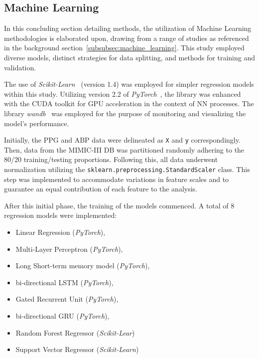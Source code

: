 \subsection{Machine Learning}
\label{subsec:ml_methods}

In this concluding section detailing methods, the utilization of Machine Learning methodologies is elaborated upon,
drawing from a range of studies as referenced in the background section~\ref{subsubsec:machine_learning}.
This study employed diverse models, distinct strategies for data splitting, and methods for training and validation.

The use of \textit{Scikit-Learn}~\cite{ScikitlearnMachineLearning} (version 1.4) was employed for simpler regression models within this study.
Utilizing version 2.2 of \textit{PyTorch}~\cite{PyTorch}, the library was enhanced with the CUDA toolkit for GPU acceleration in the context of NN processes.
The library \textit{wandb}~\cite{Wandb} was employed for the purpose of monitoring and visualizing the model's performance.

Initially, the PPG and ABP data were delineated as \texttt{X} and \texttt{y} correspondingly.
Then, data from the MIMIC-III DB was partitioned randomly adhering to the 80/20 training/testing proportions.
Following this, all data underwent normalization utilizing the \texttt{sklearn.preprocessing.StandardScaler} class.
This step was implemented to accommodate variations in feature scales and to guarantee an equal contribution of each feature to the analysis.

After this initial phase, the training of the models commenced.
A total of 8 regression models were implemented:
\begin{itemize}
    \item Linear Regression (\textit{PyTorch}),
    \item Multi-Layer Perceptron (\textit{PyTorch}),
    \item Long Short-term memory model (\textit{PyTorch}),
    \item bi-directional LSTM (\textit{PyTorch}),
    \item Gated Recurrent Unit (\textit{PyTorch}),
    \item bi-directional GRU (\textit{PyTorch}),
    \item Random Forest Regressor (\textit{Scikit-Lear})
    \item Support Vector Regressor (\textit{Scikit-Learn})
\end{itemize}


